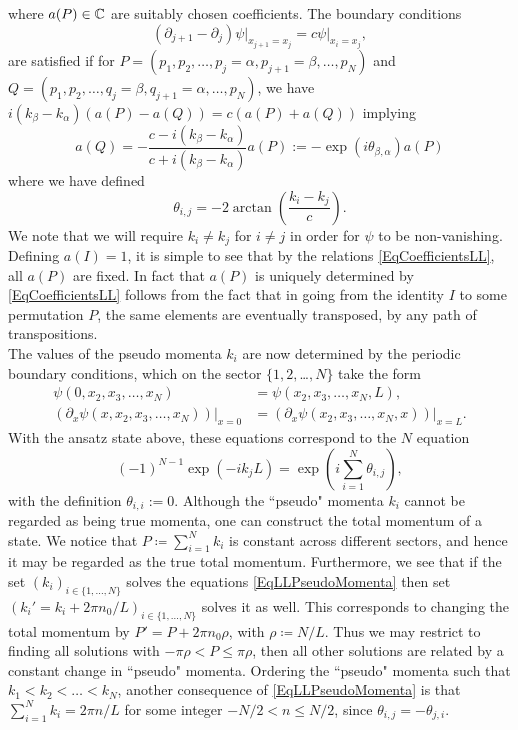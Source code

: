 where $ a(P)\in\mathbb{C} $ are suitably chosen coefficients. The boundary conditions $$
(\partial_{j+1}-\partial_j)\psi\rvert_{x_{j+1}=x_j}=c\psi\rvert_{x_i=x_j},
$$
are satisfied if for $ P=(p_1,p_2,\ldots,p_j=\alpha,p_{j+1}=\beta,\ldots,p_N) $ and $ Q=(p_1,p_2,\ldots,q_j=\beta,q_{j+1}=\alpha,\ldots,p_N) $, we have $ i(k_\beta-k_\alpha)(a(P)-a(Q))=c (a(P)+a(Q)) $ implying\begin{equation}\label{EqCoefficientsLL}
	a(Q)=-\frac{c-i(k_\beta-k_\alpha)}{c+i(k_\beta-k_\alpha)}a(P):=-\exp(i\theta_{\beta,\alpha})a(P)
\end{equation} where we have defined\begin{equation}
\theta_{i,j}=-2 \arctan\left(\frac{k_i-k_j}{c}\right).
\end{equation}
We note that we will require $ k_i\neq k_j $ for $ i\neq j $ in order for $ \psi $ to be non-vanishing. Defining $ a(I)=1 $, it is simple to see that by the relations \eqref{EqCoefficientsLL}, all $ a(P) $ are fixed. In fact that $ a(P) $ is uniquely determined by \eqref{EqCoefficientsLL} follows from the fact that in going from the identity $ I $ to some permutation $ P $, the same elements are eventually transposed, by any path of transpositions.\\
The values of the pseudo momenta $ k_i $ are now determined by the periodic boundary conditions, which on the sector $ \{1,2,$\ldots$,N\} $ take the form \begin{equation}\begin{aligned}
\psi(0,x_2,x_3,\ldots,x_N)&=\psi(x_2,x_3,\ldots,x_N,L),\\
\left(\partial_x \psi(x,x_2,x_3,\ldots,x_N) \right)\big\rvert_{x=0}&=\left(\partial_x \psi(x_2,x_3,\ldots,x_N,x) \right)\big\rvert_{x=L}.
\end{aligned}
\end{equation}
With the ansatz state above, these equations correspond to the $ N $ equation\begin{equation}\label{EqLLPseudoMomenta}
	(-1)^{N-1}\exp(-i k_j L)=\exp\left(i\sum_{i=1}^{N}\theta_{i,j}\right),
\end{equation}
with the definition $ \theta_{i,i}:=0 $. Although the ``pseudo" momenta $ k_i $ cannot be regarded as being true momenta, one can construct the total momentum of a state. We notice that $ P\coloneqq\sum_{i=1}^{N}k_i $ is constant across different sectors, and hence it may be regarded as the true total momentum. Furthermore, we see that if the set $ (k_i)_{i\in\{1,\ldots,N\}} $ solves the equations \eqref{EqLLPseudoMomenta} then set $ (k_i'=k_i+2\pi n_0 /L)_{i\in\{1,\ldots,N\}} $ solves it as well. This corresponds to changing the total momentum by $ P'=P+ 2\pi n_0 \rho $, with $ \rho\coloneqq N/L $. Thus we may restrict to finding all solutions with $ -\pi \rho <P\leq \pi \rho $, then all other solutions are related by a constant change in ``pseudo" momenta. Ordering the ``pseudo" momenta such that $ k_1<k_2<\ldots<k_N $, another consequence of \eqref{EqLLPseudoMomenta} is that $ \sum_{i=1}^{N}k_i=2\pi n/L $ for some integer $ -N/2<n\leq N/2 $, since $ \theta_{i,j}=-\theta_{j,i} $.\\

